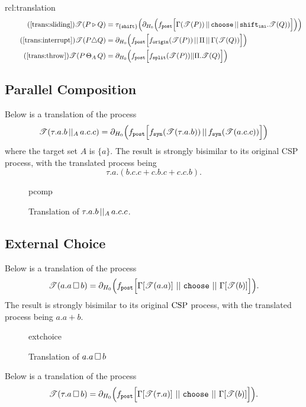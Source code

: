 \documentclass[../hons_project.tex]{subfiles}
\begin{document}
\begin{rcl}[Translation]{rcl:translation}{}
\begin{align}
		\tag{\ref{trans:sliding}}
		\trans{P \sliding Q}   & = \tau_{\{\mathtt{shift}\}}\Bigl(\partial_{H_{0}}\Bigl(f_{\mathtt{post}}\Bigl[ \Gamma(\trans{P}) \merge \mathtt{choose} \merge \mathtt{shift}_{\mathtt{ini}} . \trans{Q}) \Bigr]\Bigr)\Bigr) \\
		\tag{\ref{trans:interrupt}}
		\trans{P \interrupt Q} & = \partial_{H_{0}}\Bigl(\fdef{post}\Bigl[ \fdef{origin}(\trans{P}) \merge \Pi \merge \Gamma(\trans{Q}) \Bigr]\Bigr)                                                                          \\
		\tag{\ref{trans:throw}}
		\trans{P \throw Q}     & = \partial_{H_{0}}\Bigl(\fdef{post} \Bigl[ \fdef{split}(\trans{P}) | | \Pi.\trans{Q} \Bigr]\Bigr)
	\end{align}
\end{rcl}

\newpage

\subsection{Parallel Composition}\label{ssec:diagrams-pcomp}
Below is a translation of the process
\begin{equation}
	\mathscr{T}(\tau.a.b \,\vert\vert_{A}\, a.c.c)     = \partial_{H_{0}}\Bigl(f_{\mathtt{post}}\Bigl[f_{\mathtt{syn}}(\mathscr{T}(\tau.a.b)) \,\vert\vert\, f_{\mathtt{syn}}(\mathscr{T}(a.c.c))\Bigr]\Bigr)
\end{equation}
where the target set $A$ is $\{a\}$.
The result is strongly bisimilar to its original CSP process, with the translated process being
\[\tau.a.(b.c.c+c.b.c+c.c.b).\]
\vspace{-30pt}
\begin{figure}[H]
	\centering
	{pcomp}
	\caption{Translation of $\tau.a.b \,\vert\vert_{A}\, a.c.c$.}
\end{figure}




\subsection{External Choice}\label{ssec:diagrams-extchoice}
Below is a translation of the process
\begin{equation}
	\mathscr{T}(a.a \,\square\, b) = \partial_{H_{0}}\Bigl(f_{\mathtt{post}}\Bigl[\Gamma[\mathscr{T}(a.a)]\, \,\vert\vert\, \,\mathtt{choose}\, \,\vert\vert\, \,\Gamma[\mathscr{T}(b)]\Bigl]\Bigr).
\end{equation}
The result is strongly bisimilar to its original $\mathrm{CSP}$ process, with the translated process being $a.a + b$.
\begin{figure}[H]
	\centering
	{extchoice}
	\caption{Translation of $a.a \,\square\, b$}
\end{figure}
Below is a translation of the process
\begin{equation}
	\mathscr{T}(\tau.a \,\square\, b) = \partial_{H_{0}}\Bigl(f_{\mathtt{post}}\Bigl[\Gamma[\mathscr{T}(\tau.a)]\, \,\vert\vert\, \,\mathtt{choose}\, \,\vert\vert\, \,\Gamma[\mathscr{T}(b)]\Bigl]\Bigr).
\end{equation}
\end{document}

